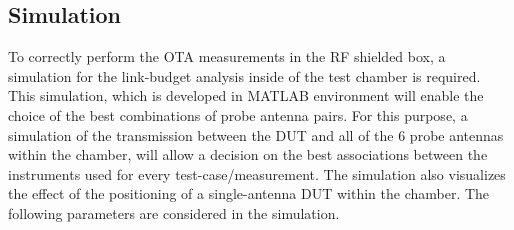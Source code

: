 \subsection{Simulation} 
To correctly perform the \acs{OTA} measurements in the \acs{RF} shielded box, a simulation for the link-budget analysis inside of the test chamber is required. This simulation, which is developed in MATLAB\textregistered{} environment will enable the choice of the best combinations of probe antenna pairs. For this purpose, a simulation of the transmission between the \acs{DUT} and all of the 6 probe antennas within the chamber, will allow a decision on the best associations between the instruments used for every test-case/measurement. The simulation also visualizes the effect of the positioning of a single-antenna \acs{DUT} within the chamber. The following parameters are considered in the simulation.
